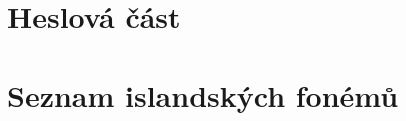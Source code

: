 
\chapter{Heslová část}

\clearpage

\fi


\ifinputletters

\cleardoublepage

\dictionarygeometry
\pagestyle{myheadings}




%

\restoregeometry
\pagestyle{plain}

\fi


\ifinputphon

\cleardoublepage

\chapter{Seznam islandských fonémů}              \label{sec:phon_phonems}


\clearpage


\fi


\ifinputmorpho

